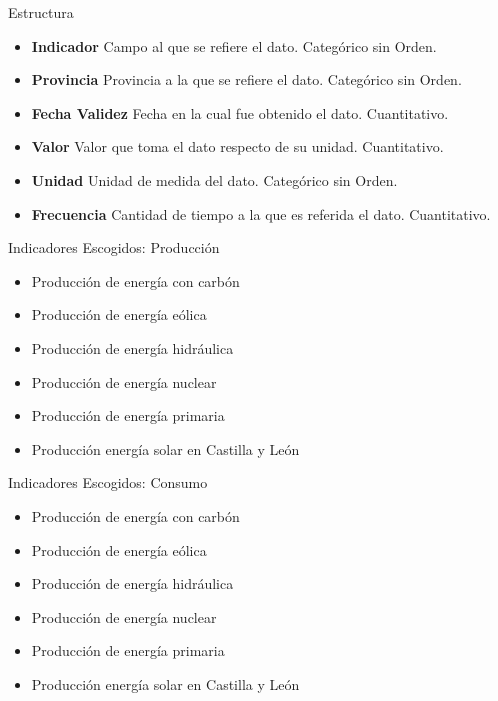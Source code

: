 \documentclass{beamer}
\begin{document}
		\begin{frame}{Estructura}
		
			\begin{itemize}
			
				\item {\bf Indicador } Campo al que se refiere el dato. Categórico sin Orden.
				
				\item {\bf Provincia } Provincia a la que se refiere el dato. Categórico sin Orden.
				
				\item {\bf Fecha Validez } Fecha en la cual fue obtenido el dato. Cuantitativo.
				
				\item {\bf Valor } Valor que toma el dato respecto de su unidad. Cuantitativo.
				
				\item {\bf Unidad } Unidad de medida del dato. Categórico sin Orden.
				
				\item {\bf Frecuencia } Cantidad de tiempo a la que es referida el dato. Cuantitativo.
			\end{itemize}
		
		\end{frame}
		
		\begin{frame}{Indicadores Escogidos: Producción}
		
			\begin{itemize}
				\item Producción de energía con carbón
				\item Producción de energía eólica
				\item Producción de energía hidráulica
				\item Producción de energía nuclear
				\item Producción de energía primaria
				\item Producción energía solar en Castilla y León	
			\end{itemize}
				
		\end{frame}
		
		\begin{frame}{Indicadores Escogidos: Consumo}
		
			\begin{itemize}
				\item Producción de energía con carbón
				\item Producción de energía eólica
				\item Producción de energía hidráulica
				\item Producción de energía nuclear
				\item Producción de energía primaria
				\item Producción energía solar en Castilla y León
			\end{itemize}
							
		\end{frame}
		
\end{document}
